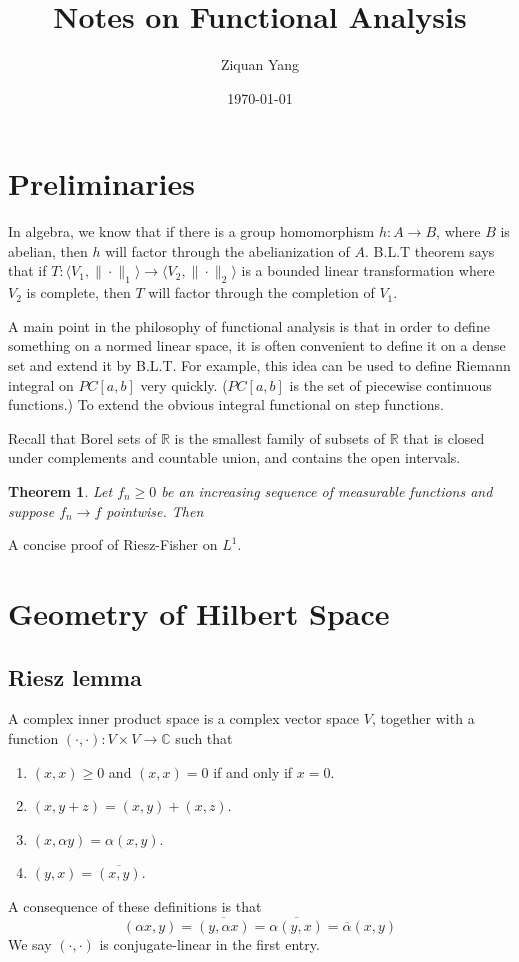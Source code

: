 \documentclass[12pt]{article}
\theoremstyle{plain}
\newtheorem{theorem}[equation]{Theorem}
\theoremstyle{definition}
\theoremstyle{named}
\newcommand{\<}{\langle}
\renewcommand{\>}{\rangle}
\newcommand{\calpha}{\overline{\alpha}}
\newcommand{\IR}{\mathbb{R}}
\newcommand{\IC}{\mathbb{C}}
\begin{document}
%

\title{Notes on Functional Analysis}
\author{Ziquan Yang}


\date{\today}

\maketitle

\tableofcontents 

\setcounter{section}{0}


\section{Preliminaries}
In algebra, we know that if there is a group homomorphism $h : A \to B$, where $B$ is abelian, then $h$ will factor through the abelianization of $A$. B.L.T theorem says that if $T : \< V_1, \| \cdot \|_1 \> \to \< V_2, \| \cdot \|_2 \>$ is a bounded linear transformation where $V_2$ is complete, then $T$ will factor through the completion of $V_1$. 

A main point in the philosophy of functional analysis is that in order to define something on a normed linear space, it is often convenient to define it on a dense set and extend it by B.L.T. For example, this idea can be used to define Riemann integral on $PC[a, b]$ very quickly. ($PC[a, b]$ is the set of piecewise continuous functions.) To extend the obvious integral functional on step functions. 

Recall that Borel sets of $\IR$ is the smallest family of subsets of $\IR$ that is closed under complements and countable union, and contains the open intervals. 

\begin{theorem}
Let $f_n \ge 0$ be an increasing sequence of measurable functions and suppose $f_n \to f$ pointwise. Then 
\end{theorem}

A concise proof of Riesz-Fisher on $L^1$.   


\section{Geometry of Hilbert Space}
\subsection{Riesz lemma}
A complex inner product space is a complex vector space $V$, together with a function $(\cdot, \cdot) : V \times V \to \IC$ such that 
\begin{enumerate}
\item $(x, x) \ge 0$ and $(x, x) = 0$ if and only if $x = 0$. 
\item $(x, y + z) = (x, y) + (x, z)$. 
\item $(x, \alpha y) = \alpha (x, y) $. 
\item $(y, x ) = \overline{(x, y)}$. 
\end{enumerate}
A consequence of these definitions is that 
$$ (\alpha x, y) = \overline{(y, \alpha x)} = \overline{\alpha(y, x)} = \calpha (x, y) $$
We say $(\cdot, \cdot)$ is conjugate-linear in the first entry. 
\end{document}
